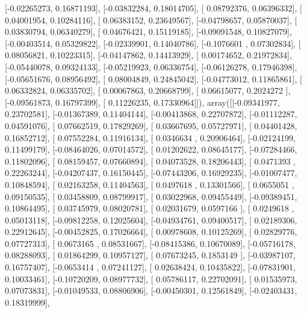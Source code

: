 \documentclass{article}
\begin{document}
       [-0.02265273,  0.16871193],
       [-0.03832284,  0.18014705],
       [ 0.08792376,  0.06396332],
       [ 0.04001954,  0.10284116],
       [ 0.06383152,  0.23649567],
       [-0.04798657,  0.05870037],
       [ 0.03830794,  0.06340279],
       [ 0.04676421,  0.15119185],
       [-0.09091548,  0.10827079],
       [-0.00403514,  0.05329822],
       [-0.02339901,  0.14040786],
       [-0.1076601 ,  0.07302834],
       [ 0.08056821,  0.10223315],
       [-0.04147862,  0.14413929],
       [ 0.00174652,  0.21972834],
       [-0.05440078,  0.09324133],
       [-0.05219923,  0.06336754],
       [-0.06126278,  0.17946398],
       [-0.05651676,  0.08956492],
       [ 0.08004849,  0.24845042],
       [-0.04773012,  0.11865861],
       [ 0.06332824,  0.06335702],
       [ 0.00067863,  0.20668799],
       [ 0.06615077,  0.2024272 ],
       [-0.09561873,  0.16797399],
       [ 0.11226235,  0.17330964]]), array([[-0.09341977,  0.23702581],
       [-0.01367389,  0.11404144],
       [-0.00413868,  0.22707872],
       [-0.01112287,  0.04591076],
       [ 0.07662519,  0.17829269],
       [ 0.03667695,  0.05727971],
       [ 0.04401428,  0.16852712],
       [ 0.07552284,  0.11916134],
       [ 0.0346634 ,  0.20906464],
       [-0.02124199,  0.11499179],
       [-0.08464026,  0.07014572],
       [ 0.01202622,  0.08645177],
       [-0.07284466,  0.11802096],
       [ 0.08159457,  0.07660894],
       [ 0.04073528,  0.18206443],
       [ 0.0471393 ,  0.22263244],
       [-0.04207437,  0.16150445],
       [-0.07443206,  0.16929235],
       [-0.01007477,  0.10848594],
       [ 0.02163258,  0.11404563],
       [ 0.0497618 ,  0.13301566],
       [ 0.0655051 ,  0.09150535],
       [ 0.03458809,  0.08799917],
       [ 0.03022968,  0.09455449],
       [-0.09389451,  0.10864495],
       [ 0.03745979,  0.08020781],
       [ 0.02031679,  0.0597166 ],
       [ 0.0249618 ,  0.05013118],
       [-0.09812258,  0.12025604],
       [-0.04934761,  0.09400517],
       [ 0.02189306,  0.22912645],
       [-0.00452825,  0.17026664],
       [ 0.00978608,  0.10125269],
       [ 0.02829776,  0.07727313],
       [ 0.0673165 ,  0.08531667],
       [-0.08415386,  0.10670089],
       [-0.05716178,  0.08288093],
       [ 0.01864299,  0.10957127],
       [ 0.07673245,  0.1853149 ],
       [-0.03987107,  0.16757407],
       [-0.0653414 ,  0.07241127],
       [ 0.02638424,  0.10435822],
       [-0.07831901,  0.10033461],
       [-0.10720209,  0.08977732],
       [ 0.05786117,  0.22702091],
       [ 0.01535973,  0.07073831],
       [-0.01049533,  0.08806906],
       [-0.00450301,  0.12561849],
       [-0.02403431,  0.18319999],
\end{document}
